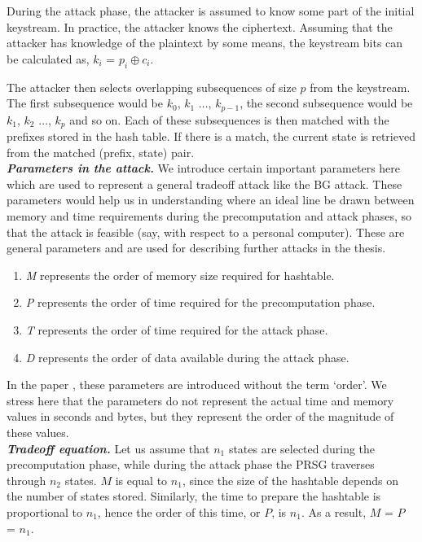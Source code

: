 During the attack phase, the attacker is assumed to know some part of the initial keystream. In practice, the attacker knows the ciphertext. Assuming that the attacker has knowledge of the plaintext by some means, the keystream bits can be calculated as, $k_i$ = $p_i \oplus c_i$. 

The attacker then selects overlapping subsequences of size $p$ from the keystream. The first subsequence would be $k_0$, $k_1$ $\ldots$, $k_{p-1}$, the second subsequence would be $k_1$, $k_2$ $\ldots$, $k_{p}$ and so on. Each of these subsequences is then matched with the prefixes stored in the hash table. If there is a match, the current state is retrieved from the matched (prefix, state) pair.\\

\noindent \textit{\textbf{Parameters in the attack.}} We introduce certain important parameters here \cite{biryukov2000ctm} which are used to represent a general tradeoff attack like the BG attack. These parameters would help us in understanding where an ideal line be drawn between memory and time requirements during the precomputation and attack phases, so that the attack is feasible (say, with respect to a personal computer). These are general parameters and are used for describing further attacks in the thesis. 

\begin{enumerate}
\item \emph{M} represents the order of memory size required for hashtable.
\item \emph{P} represents the order of time required for the precomputation phase.
\item \emph{T} represents the order of time required for the attack phase.
\item \emph{D} represents the order of data available during the attack phase.
\end{enumerate}

In the paper \cite{biryukov2000ctm}, these parameters are introduced without the term \mbox{`order'}. We stress here that the parameters do not represent the actual time and memory values in seconds and bytes, but they represent the order of the magnitude of these values.\\

\noindent \textit{\textbf{Tradeoff equation.}} Let us assume that $n_1$ states are selected during the precomputation phase, while during the attack phase the PRSG traverses through $n_2$ states. $M$ is equal to $n_1$, since the size of the hashtable depends on the number of states stored. Similarly, the time to prepare the hashtable is proportional to $n_1$, hence the order of this time, or $P$, is $n_1$. As a result, $M$ = $P$ = $n_1$.

